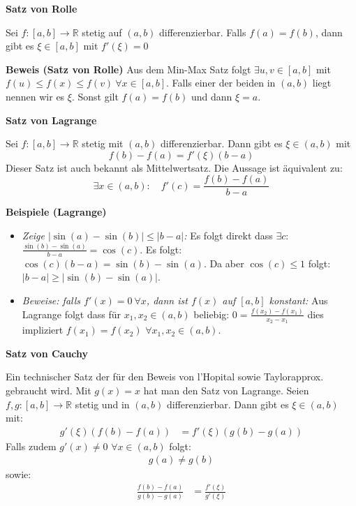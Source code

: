 \documentclass[25pt]{sciposter}
\newcommand{\R}{\mathbb{R}}
\newenvironment{method}[1]{\begin{mdframed}[backgroundcolor=blue!10,innertopmargin=15pt, innerbottommargin=15pt, nobreak=true]
		\textbf{#1 }
	}
	{ 
	\end{mdframed}
}
\begin{document}
\begin{multicols}{3}
\begin{method}{Satz von Rolle}
	Sei $f: [a,b] \to \R$ stetig auf $(a,b)$ differenzierbar. Falls $f(a) = f(b)$, dann gibt es $\xi \in [a,b]$ mit $f'(\xi) = 0$
\end{method}
\textbf{Beweis (Satz von Rolle)} Aus dem Min-Max Satz folgt $\exists u,v \in [a,b]$ mit $f(u) \leq f(x) \leq f(v) \ \forall x \in [a,b]$. Falls einer der beiden in $(a,b)$ liegt nennen wir es $\xi$. Sonst gilt $f(a) = f(b)$ und dann $\xi = a$.


\begin{method}{Satz von Lagrange}
	Sei $f:[a,b] \to \R$ stetig mit $(a,b)$ differenzierbar. Dann gibt es $\xi \in (a,b)$ mit $$f(b) - f(a) = f'(\xi) (b-a)$$
	Dieser Satz ist auch bekannt als Mittelwertsatz. Die Aussage ist äquivalent zu: 
	$$\exists x \in (a,b) : \quad f'(c) = \frac{f(b) -f(a) }{b-a}$$
\end{method}
\textbf{Beispiele (Lagrange)}
\begin{itemize}
	\item \textit{Zeige $|\sin(a) - \sin(b)| \leq |b-a|$:} Es folgt direkt dass $\exists c$: $\frac{\sin(b)- \sin(a)}{b-a} = \cos(c)$. Es folgt: $\cos(c) (b-a) = \sin(b) - \sin(a)$. Da aber $\cos(c) \leq 1$ folgt:
	$|b-a| \geq |\sin(b) - \sin(a)|$.
	\item \textit{Beweise: falls $f'(x) = 0 \ \forall x$, dann ist $f(x)$ auf $[a,b]$ konstant:} Aus Lagrange folgt dass für $x_1,x_2\in (a,b)$ beliebig: $0 = \frac{f(x_2)-f(x_1)}{x_2-x_1}$ dies impliziert $f(x_1) = f(x_2)$ $\forall x_1,x_2 \in (a,b)$.
\end{itemize}



\begin{method}{Satz von Cauchy}
	Ein technischer Satz der für den Beweis von l'Hopital sowie Taylorapprox. gebraucht wird. Mit $g(x)=x$ hat man den Satz von Lagrange. \newline
Seien $f,g:[a,b]\to \R$ stetig und in $(a,b)$ differenzierbar. Dann gibt es $\xi \in (a,b)$ mit:
\begin{align*}
	g'(\xi)(f(b)-f(a)) &= f'(\xi)(g(b) - g(a))
\end{align*}
Falls zudem $g'(x) \not = 0$ $\forall x \in (a,b)$ folgt:
\begin{align*}
	g(a) \not = g(b)
\end{align*}
sowie:
\begin{align*}
	\frac{f(b) - f(a)}{g(b) - g(a)} &= \frac{f'(\xi)}{g'(\xi)}
\end{align*}
\end{method}



\end{multicols}
\end{document}
